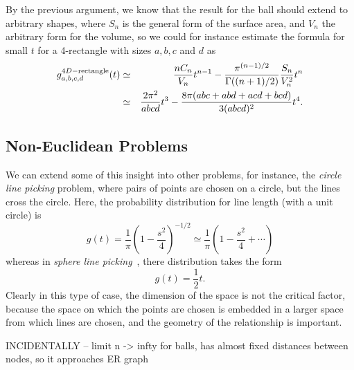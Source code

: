 \documentclass{article}
\begin{document}
By the previous argument, we know that the result for the ball should
extend to arbitrary shapes, where $S_n$ is the general form of the
surface area, and $V_n$ the arbitrary form for the volume, so we could
for instance estimate the formula for small $t$ for a 4-rectangle with
sizes $a,b,c$ and $d$ as
\begin{eqnarray}
  g^{4D-{\rm rectangle}}_{a,b,c,d}(t)
 & \simeq  & 
      \frac{n C_n}{V_n} t^{n-1}
    -  \frac{ \pi^{(n-1)/2} }{\Gamma((n+1)/2)}
        \frac{S_n}{ V_n^2} t^{n} \nonumber \\
 & \simeq  & 
      \frac{2 \pi^{2}}{ a b c d} t^{3}
      -  \frac{8 \pi(abc + a b d + a c d + b c d)}{ 3 (a b c d)^2} t^{4}.
\end{eqnarray}




\subsection{Non-Euclidean Problems}

We can extend some of this insight into other problems, for instance,
the {\em circle line picking} problem, where pairs of points are
chosen on a circle, but the lines cross the circle. Here, the
probability distribution for line length (with a unit circle) is
\cite{weisstein:_circle_line_picking}
\begin{equation}
  \label{eq:circle_line_picking}
  g(t) = \frac{1}{\pi} \left(    
           1 - \frac{s^2}{4}
               \right)^{-1/2} 
       \simeq \frac{1}{\pi} \left( 1 - \frac{s^2}{4} + \cdots \right) 
\end{equation}
whereas in {\em sphere line
  picking}~\cite{weisstein:_sphere_line_picking}, there distribution
takes the form
\begin{equation}
  \label{eq:sphere_line_picking_approx}
  g(t) = \frac{1}{2} t.
\end{equation}
Clearly in this type of case, the dimension of the space is not the
critical factor, because the space on which the points are chosen is
embedded in a larger space from which lines are chosen, and the
geometry of the relationship is important.


INCIDENTALLY -- limit n -> infty for balls, has almost fixed distances
between nodes, so it approaches ER graph
\end{document}
